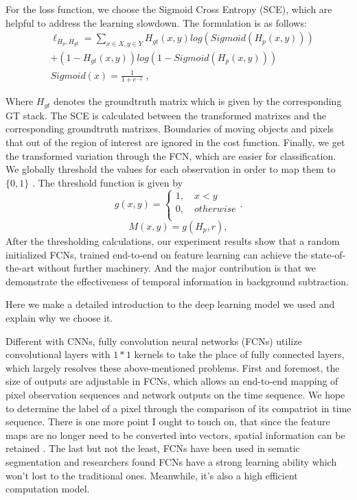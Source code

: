 \documentclass[journal]{IEEEtran}
\begin{document}
For the loss function, we choose the Sigmoid Cross Entropy (SCE), which are helpful to address the learning slowdown. 
The formulation is as follows:
\begin{equation}
    \begin{aligned}
        & \ell_{H_p, H_{gt}} =  \sum\limits_{x \in X, y \in Y}^{} H_{gt}(x,y) log(Sigmoid(H_p(x,y)))  \\
        & + (1 - H_{gt}(x,y)) log(1 - Sigmoid(H_p(x,y))) \\
        & Sigmoid(x) =\frac{1}{1+e^{-x}}\  ,
    \end{aligned}
\end{equation}

Where $H_{gt}$ denotes the groundtruth matrix which is given by the corresponding GT stack. 
The SCE is calculated between the transformed matrixes and the corresponding groundtruth matrixes. 
Boundaries of moving objects and pixels that out of the region of interest are ignored in the cost function.
Finally, we get the transformed variation through the FCN, which are easier for classification. 
We globally threshold the values for each observation in order to map them to $\{0,1\}$ . 
The threshold function is given by
\begin{equation}
    \label{piecewise_fg}
    g(x,y) =
 \begin{cases}
  1,  \quad x < y       \\
  0,  \quad otherwise   \\
\end{cases}.
\end{equation}
\begin{equation}
M(x,y)=g(H_p,r) ,
\end{equation}
After the thresholding calculations, our experiment results show that a random initialized FCNs, trained end-to-end on feature learning can achieve the state-of-the-art without further machinery. 
And the major contribution is that we demonstrate the effectiveness of temporal information in background 
subtraction.

Here we make a detailed introduction to the deep learning model we used and explain why we choose it.

Different with CNNs, fully convolution neural networks (FCNs) utilize convolutional layers with $1*1$ kernels to take the place of fully connected layers, which largely resolves these above-mentioned problems. 
First and foremost, the size of outputs are adjustable in FCNs, which allows an end-to-end mapping of pixel observation sequences and network outputs on the time sequence. 
We hope to determine the label of a pixel through the comparison of its compatriot in time sequence. 
There is one more point I ought to touch on, that since the feature maps are no longer need to be converted into vectors, spatial information can be retained . 
The last but not the least, FCNs have been used in sematic segmentation and researchers found FCNs have a strong learning ability which won’t lost to the traditional ones. 
Meanwhile, it’s also a high efficient computation model. 
\end{document}
